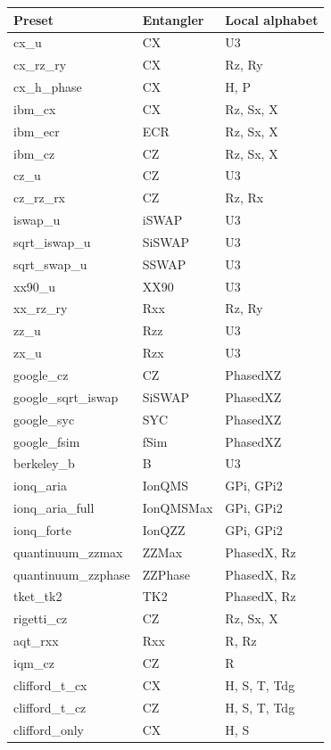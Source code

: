 \begin{center}\small\begin{tabular}{lll}\toprule
Preset & Entangler & Local alphabet\\\midrule
cx\_u & CX & U3\\
cx\_rz\_ry & CX & Rz, Ry\\
cx\_h\_phase & CX & H, P\\
ibm\_cx & CX & Rz, Sx, X\\
ibm\_ecr & ECR & Rz, Sx, X\\
ibm\_cz & CZ & Rz, Sx, X\\
cz\_u & CZ & U3\\
cz\_rz\_rx & CZ & Rz, Rx\\
iswap\_u & iSWAP & U3\\
sqrt\_iswap\_u & SiSWAP & U3\\
sqrt\_swap\_u & SSWAP & U3\\
xx90\_u & XX90 & U3\\
xx\_rz\_ry & Rxx & Rz, Ry\\
zz\_u & Rzz & U3\\
zx\_u & Rzx & U3\\
google\_cz & CZ & PhasedXZ\\
google\_sqrt\_iswap & SiSWAP & PhasedXZ\\
google\_syc & SYC & PhasedXZ\\
google\_fsim & fSim & PhasedXZ\\
berkeley\_b & B & U3\\
ionq\_aria & IonQMS & GPi, GPi2\\
ionq\_aria\_full & IonQMSMax & GPi, GPi2\\
ionq\_forte & IonQZZ & GPi, GPi2\\
quantinuum\_zzmax & ZZMax & PhasedX, Rz\\
quantinuum\_zzphase & ZZPhase & PhasedX, Rz\\
tket\_tk2 & TK2 & PhasedX, Rz\\
rigetti\_cz & CZ & Rz, Sx, X\\
aqt\_rxx & Rxx & R, Rz\\
iqm\_cz & CZ & R\\
clifford\_t\_cx & CX & H, S, T, Tdg\\
clifford\_t\_cz & CZ & H, S, T, Tdg\\
clifford\_only & CX & H, S\\
\bottomrule\end{tabular}\end{center}
